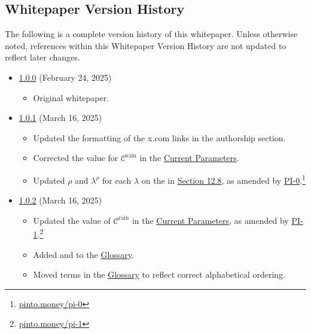 \documentclass[class=article, crop=false]{standalone}
\begin{document}

\subsection{Whitepaper Version History}

The following is a complete version history of this whitepaper. Unless otherwise noted, references within this Whitepaper Version History are not updated to reflect later changes.

\begin{itemize}[topsep=0pt, itemsep=3pt,leftmargin=16pt]
    \item \href{https://github.com/pinto-org/whitepaper/blob/master/version-history/pinto1_0_0.pdf}{1.0.0} (February 24, 2025)
    
    \begin{itemize}
        \item Original whitepaper.
    \end{itemize}
    
    \item \href{https://github.com/pinto-org/whitepaper/blob/master/version-history/pinto1_0_1.pdf}{1.0.1} (March 16, 2025)
    
    \begin{itemize}
        \item Updated the formatting of the x.com links in the authorship section.
        \item Corrected the value for $\mathscr{C}^{\text{rain}}$ in the \hyperlink{subsection.12.1}{Current Parameters}.
        \item Updated $\rho$ and $\lambda^{\rho}$ for each $\lambda$ on the  in \hyperlink{subsection.12.8}{Section 12.8}, as amended by \href{https://pinto.money/pi-0}{PI-0}.\footnote{\href{https://pinto.money/pi-0}{pinto.money/pi-0}}
    \end{itemize}

    \item \href{https://github.com/pinto-org/whitepaper/blob/master/version-history/pinto1_0_2.pdf}{1.0.2} (March 16, 2025)
    
    \begin{itemize}
        \item Updated the value of $\mathscr{C}^{\text{rain}}$ in the \hyperlink{subsection.12.1}{Current Parameters}, as amended by \href{https://pinto.money/pi-1}{PI-1}.\footnote{\href{https://pinto.money/pi-1}{pinto.money/pi-1}}
        \item Added  and  to the \hyperlink{subsection.12.14}{Glossary}.
        \item Moved terms in the \hyperlink{subsection.12.14}{Glossary} to reflect correct alphabetical ordering.
    \end{itemize}
    
\end{itemize}
\end{document}
